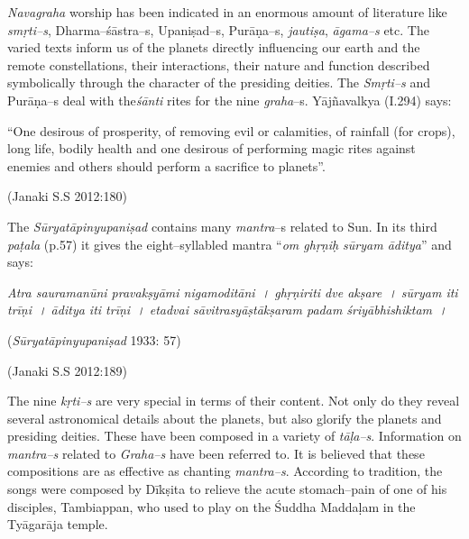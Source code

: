 \textit{Navagraha} worship has been indicated in an enormous amount of literature like \textit{smṛti–s}, Dharma–śāstra–s, Upaniṣad–s, Purāṇa–s, \textit{jautiṣa}, \textit{āgama–s} etc. The varied texts inform us of the planets directly influencing our earth and the remote constellations, their interactions, their nature and function described symbolically through the character of the presiding deities. The \textit{Smṛti–s} and Purāṇa–s deal with the\textit{śānti} rites for the nine \textit{graha}–s. Yājñavalkya (I.294) says:

\begin{myquote}
“One desirous of prosperity, of removing evil or calamities, of rainfall (for crops), long life, bodily health and one desirous of performing magic rites against enemies and others should perform a sacrifice to planets”.
\end{myquote}

\begin{flushright}
(Janaki S.S 2012:180)
\end{flushright}

The \textit{Sūryatāpinyupaniṣad} contains many \textit{mantra}–s related to Sun. In its third \textit{paṭala} (p.57) it gives the eight–syllabled mantra “\textit{om ghṛṇiḥ sūryam āditya}” and says:

\textit{Atra sauramanūni pravakṣyāmi nigamoditāni~। ghṛṇiriti dve akṣare~। sūryam iti trīṇi~। āditya iti trīṇi~। etadvai sāvitrasyāṣtākṣaram padam śriyābhishiktam~।}

\begin{flushright}
(\textit{Sūryatāpinyupaniṣad} 1933: 57)
\end{flushright}

\begin{flushright}
(Janaki S.S 2012:189)
\end{flushright}

The nine \textit{kṛti–s} are very special in terms of their content. Not only do they reveal several astronomical details about the planets, but also glorify the planets and presiding deities. These have been composed in a variety of \textit{tāḷa–s}. Information on \textit{mantra–s} related to \textit{Graha–s} have been referred to. It is believed that these compositions are as effective as chanting \textit{mantra–s}. According to tradition, the songs were composed by Dīkṣita to relieve the acute stomach–pain of one of his disciples, Tambiappan, who used to play on the Śuddha Maddaḷam in the Tyāgarāja temple.

